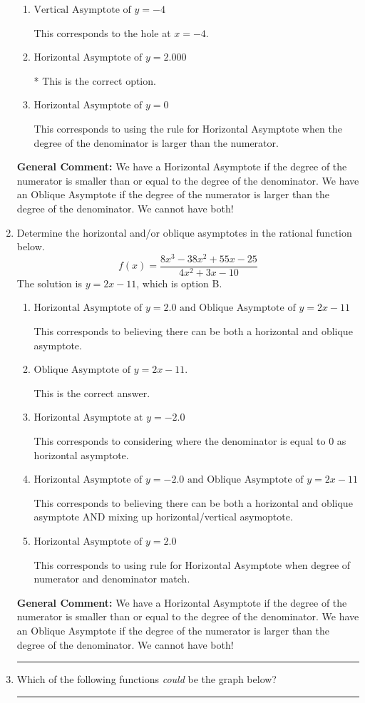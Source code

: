\documentclass{extbook}[14pt]
\newcommand{\litem}[1]{\item #1

\rule{\textwidth}{0.4pt}}
\begin{document}
\begin{enumerate}
{\begin{enumerate}[label=\Alph*.]
This corresponds to the hole at $x = 4.000$.
\item \( \text{Vertical Asymptote of } y = -4  \)

This corresponds to the hole at $x = -4$.
\item \( \text{Horizontal Asymptote of } y = 2.000  \)

* This is the correct option.
\item \( \text{Horizontal Asymptote of } y = 0  \)

This corresponds to using the rule for Horizontal Asymptote when the degree of the denominator is larger than the numerator.
\end{enumerate}

\textbf{General Comment:} We have a Horizontal Asymptote if the degree of the numerator is smaller than or equal to the degree of the denominator. We have an Oblique Asymptote if the degree of the numerator is larger than the degree of the denominator. We cannot have both!
}
\litem{
Determine the horizontal and/or oblique asymptotes in the rational function below.
\[ f(x) = \frac{8x^{3} -38 x^{2} +55 x -25}{4x^{2} +3 x -10} \]The solution is \( y = 2x -11 \), which is option B.\begin{enumerate}[label=\Alph*.]
\item \( \text{Horizontal Asymptote of } y = 2.0 \text{ and Oblique Asymptote of } y = 2x -11 \)

This corresponds to believing there can be both a horizontal and oblique asymptote.
\item \( \text{Oblique Asymptote of } y = 2x -11. \)

This is the correct answer.
\item \( \text{Horizontal Asymptote at } y = -2.0 \)

This corresponds to considering where the denominator is equal to 0 as horizontal asymptote.
\item \( \text{Horizontal Asymptote of } y = -2.0 \text{ and Oblique Asymptote of } y = 2x -11 \)

This corresponds to believing there can be both a horizontal and oblique asymptote AND mixing up horizontal/vertical asymoptote.
\item \( \text{Horizontal Asymptote of } y = 2.0  \)

This corresponds to using rule for Horizontal Asymptote when degree of numerator and denominator match.
\end{enumerate}

\textbf{General Comment:} We have a Horizontal Asymptote if the degree of the numerator is smaller than or equal to the degree of the denominator. We have an Oblique Asymptote if the degree of the numerator is larger than the degree of the denominator. We cannot have both!
}
\litem{
Which of the following functions \textit{could} be the graph below?

}
\end{enumerate}
\end{document}

